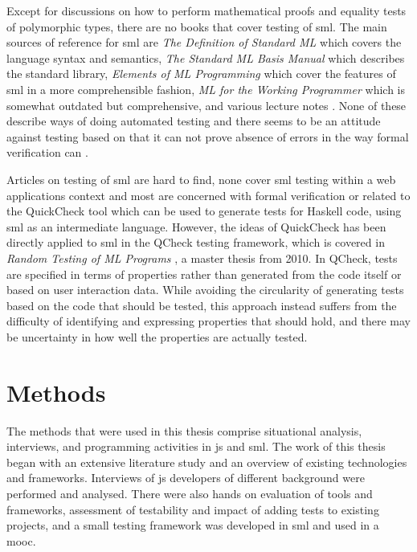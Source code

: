\documentclass[11pt]{article}
\begin{document}
Except for discussions on how to perform mathematical proofs and equality tests of polymorphic types, there are no books that cover testing of \gls{sml}. The main sources of reference for \gls{sml} are \emph{The Definition of Standard ML} \cite{DefinitionStandardML} which covers the language syntax and semantics, \emph{The Standard ML Basis Manual} \cite{BasisManual} which describes the standard library, \emph{Elements of ML Programming} \cite{ElementsML} which cover the features of \gls{sml} in a more comprehensible fashion, \emph{ML for the Working Programmer} \cite{WorkingProgrammer} which is somewhat outdated but comprehensive, and various lecture notes \cite{ProgSml97}\cite{ProgSmlHarper}\cite{FunctionalML}\cite{NotesSMLNJ}. None of these describe ways of doing automated testing and there seems to be an attitude against testing based on that it can not prove absence of errors in the way formal verification can \cite[p.~16]{ProgSmlHarper}.

Articles on testing of \gls{sml} are hard to find, none cover \gls{sml} testing within a web applications context and most are concerned with formal verification or related to the QuickCheck tool which can be used to generate tests for Haskell code, using \gls{sml} as an intermediate language. However, the ideas of QuickCheck has been directly applied to \gls{sml} in the QCheck testing framework, which is covered in \emph{Random Testing of ML Programs} \cite{RandomML}, a master thesis from 2010. In QCheck, tests are specified in terms of properties rather than generated from the code itself or based on user interaction data. While avoiding the circularity of generating tests based on the code that should be tested, this approach instead suffers from the difficulty of identifying and expressing properties that should hold, and there may be uncertainty in how well the properties are actually tested.


\section{Methods}
\label{sec:methods}

The methods that were used in this thesis comprise situational analysis, interviews, and programming activities in \gls{js} and \gls{sml}. The work of this thesis began with an extensive literature study and an overview of existing technologies and frameworks. Interviews of \gls{js} developers of different background were performed and analysed. There were also hands on evaluation of tools and frameworks, assessment of testability and impact of adding tests to existing projects, and a small testing framework was developed in \gls{sml} and used in a \gls{mooc}.
\end{document}
